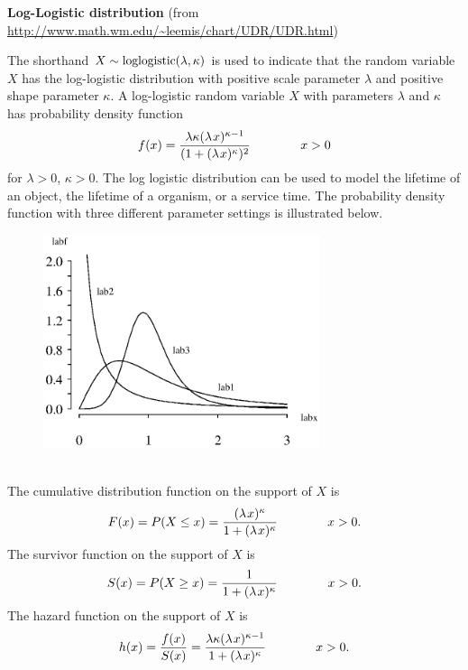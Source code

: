 \documentclass[12pt,fullpage]{article}
\begin{document}
\noindent
{\bf Log-Logistic distribution} (from \color{blue}\url{http://www.math.wm.edu/~leemis/chart/UDR/UDR.html}\color{black})

\noindent
The shorthand $X \sim {\rm loglogistic}(\lambda, \kappa)$ is used to indicate that the
random variable $X$ has the log-logistic distribution with positive scale parameter $\lambda$ and positive shape parameter $\kappa$.
A log-logistic random variable $X$ with parameters $\lambda$ and $\kappa$ 
has probability density function 
$$
f(x) = \frac{\lambda \kappa (\lambda \kern 0.08 em x)^{\kappa-1}}{(1 + (\lambda\kern 0.08 em  x)^\kappa)^2} \qquad \qquad x > 0
$$
for $\lambda > 0$, $\kappa > 0$.
The log logistic distribution can be used to model the lifetime of an object, the lifetime of a organism, or a service time.
The probability density function with three different parameter settings is illustrated below.
{\begin{figure}[h!]
\begin{center}
\includegraphics[width=3.2in]{LoglogisticPlot.ps}
\end{center}
\end{figure}}\\
The cumulative distribution function on
the support of $X$ is 
$$
F(x) = P(X \le x) = \frac{(\lambda \kern 0.08 em x)^\kappa}{1+ (\lambda \kern 0.08 em x)^\kappa} \qquad \qquad x > 0.
$$
The survivor function on the support of $X$ is
$$
S(x) = P(X \ge x) =  \frac{1}{1+ (\lambda \kern 0.08 em x)^\kappa}\qquad \qquad x > 0.
$$
The hazard function on the support of $X$ is
$$
h(x) = \frac{f(x)}{S(x)} = \frac{\lambda \kappa(\lambda \kern 0.08 em x)^{\kappa-1}}{1 + (\lambda\kern 0.08 em x)^\kappa } \qquad \qquad x > 0.
$$
\end{document}
